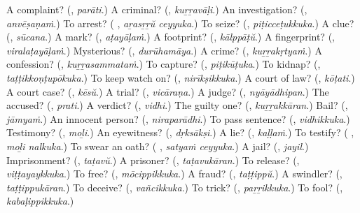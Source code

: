 \begin{tcolorbox}[breakable,colback=teal!4,colframe=teal!35!black,title={Before you move on}]
A complaint? (\textbf{}, \emph{parāti}.) A criminal? (\textbf{}, \emph{kuṟṟavāḷi}.) An investigation? (\textbf{}, \emph{anvēṣaṇaṁ}.) To arrest? (\textbf{ }, \emph{aṟasṟṟŭ ceyyuka}.) To seize? (\textbf{}, \emph{piṭicceṭukkuka}.) A clue? (\textbf{}, \emph{sūcana}.) A mark? (\textbf{}, \emph{aṭayāḷaṁ}.) A footprint? (\textbf{}, \emph{kālppāṭŭ}.) A fingerprint? (\textbf{}, \emph{viralaṭayāḷaṁ}.) Mysterious? (\textbf{}, \emph{durūhamāya}.) A crime? (\textbf{}, \emph{kuṟṟakṛtyaṁ}.) A confession? (\textbf{}, \emph{kuṟṟasammataṁ}.) To capture? (\textbf{}, \emph{piṭikūṭuka}.) To kidnap? (\textbf{}, \emph{taṭṭikkoṇṭupōkuka}.) To keep watch on? (\textbf{}, \emph{nirīkṣikkuka}.) A court of law? (\textbf{}, \emph{kōṭati}.) A court case? (\textbf{}, \emph{kēsŭ}.) A trial? (\textbf{}, \emph{vicāraṇa}.) A judge? (\textbf{}, \emph{nyāyādhipan}.) The accused? (\textbf{}, \emph{prati}.) A verdict? (\textbf{}, \emph{vidhi}.) The guilty one? (\textbf{}, \emph{kuṟṟakkāran}.) Bail? (\textbf{}, \emph{jāmyaṁ}.) An innocent person? (\textbf{}, \emph{niraparādhi}.) To pass sentence? (\textbf{}, \emph{vidhikkuka}.) Testimony? (\textbf{}, \emph{moḻi}.) An eyewitness? (\textbf{}, \emph{dṛksākṣi}.) A lie? (\textbf{}, \emph{kaḷḷaṁ}.) To testify? (\textbf{ }, \emph{moḻi nalkuka}.) To swear an oath? (\textbf{ }, \emph{satyaṁ ceyyuka}.) A jail? (\textbf{}, \emph{jayil}.) Imprisonment? (\textbf{}, \emph{taṭavŭ}.) A prisoner? (\textbf{}, \emph{taṭavukāran}.) To release? (\textbf{}, \emph{viṭṭayaykkuka}.) To free? (\textbf{}, \emph{mōcippikkuka}.) A fraud? (\textbf{}, \emph{taṭṭippŭ}.) A swindler? (\textbf{}, \emph{taṭṭippukāran}.) To deceive? (\textbf{}, \emph{vañcikkuka}.) To trick? (\textbf{}, \emph{paṟṟikkuka}.) To fool? (\textbf{}, \emph{kabaḷippikkuka}.)
\end{tcolorbox}
